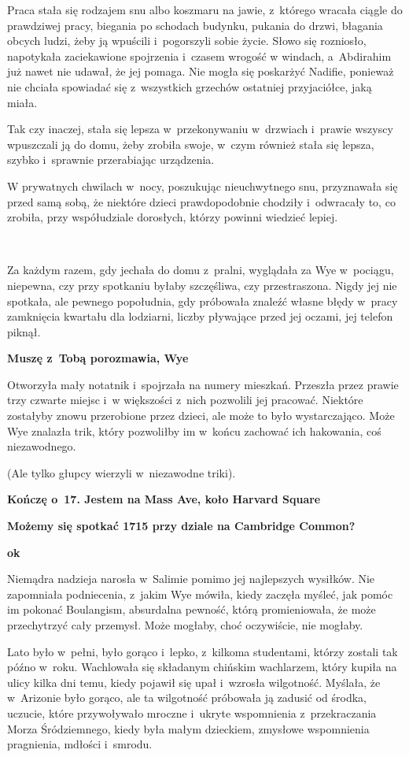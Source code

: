\documentclass[oneside,polish,11pt,sfheadings]{mwbk}
\begin{document}
Praca stała się rodzajem snu albo koszmaru na jawie, z~którego wracała
ciągle do prawdziwej pracy, biegania po schodach budynku, pukania do
drzwi, błagania obcych ludzi, żeby ją wpuścili i~pogorszyli sobie życie.
Słowo się rozniosło, napotykała zaciekawione spojrzenia i~czasem wrogość
w windach, a~Abdirahim już nawet nie udawał, że jej pomaga. Nie mogła
się poskarżyć Nadifie, ponieważ nie chciała spowiadać się z~wszystkich
grzechów ostatniej przyjaciółce, jaką miała.

Tak czy inaczej, stała się lepsza w~przekonywaniu w~drzwiach i~prawie
wszyscy wpuszczali ją do domu, żeby zrobiła swoje, w~czym również stała
się lepsza, szybko i~sprawnie przerabiając urządzenia.

W prywatnych chwilach w~nocy, poszukując nieuchwytnego snu, przyznawała
się przed samą sobą, że niektóre dzieci prawdopodobnie chodziły i~odwracały to, co zrobiła, przy współudziale dorosłych, którzy powinni
wiedzieć lepiej.

~

Za każdym razem, gdy jechała do domu z~pralni, wyglądała za Wye w~pociągu, niepewna, czy przy spotkaniu byłaby szczęśliwa, czy
przestraszona. Nigdy jej nie spotkała, ale pewnego popołudnia, gdy
próbowała znaleźć własne błędy w~pracy zamknięcia kwartału dla
lodziarni, liczby pływające przed jej oczami, jej telefon piknął.

\textbf{ Muszę z~Tobą porozmawia, Wye}

Otworzyła mały notatnik i~spojrzała na numery mieszkań. Przeszła przez
prawie trzy czwarte miejsc i~w większości z~nich pozwolili jej pracować.
Niektóre zostałyby znowu przerobione przez dzieci, ale może to było
wystarczająco. Może Wye znalazła trik, który pozwoliłby im w~końcu
zachować ich hakowania, coś niezawodnego.

(Ale tylko głupcy wierzyli w~niezawodne triki).

\textbf{ Kończę o~17. Jestem na Mass Ave, koło Harvard
Square}

\textbf{ Możemy się spotkać 1715 przy dziale na Cambridge
Common?}

\textbf{ ok}

Niemądra nadzieja narosła w~Salimie pomimo jej najlepszych wysiłków. Nie
zapomniała podniecenia, z~jakim Wye mówiła, kiedy zaczęła myśleć, jak
pomóc im pokonać Boulangism, absurdalna pewność, którą promieniowała, że
może przechytrzyć cały przemysł. Może mogłaby, choć oczywiście, nie
mogłaby.

Lato było w~pełni, było gorąco i~lepko, z~kilkoma studentami, którzy
zostali tak późno w~roku. Wachlowała się składanym chińskim wachlarzem,
który kupiła na ulicy kilka dni temu, kiedy pojawił się upał i~wzrosła
wilgotność. Myślała, że w~Arizonie było gorąco, ale ta wilgotność
próbowała ją zadusić od środka, uczucie, które przywoływało mroczne i~ukryte wspomnienia z~przekraczania Morza Śródziemnego, kiedy była małym
dzieckiem, zmysłowe wspomnienia pragnienia, mdłości i~smrodu.
\end{document}
